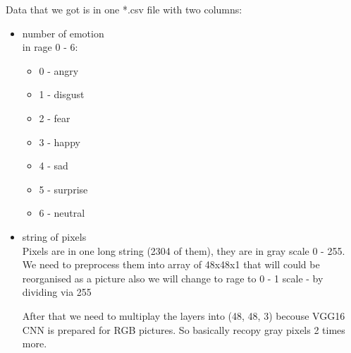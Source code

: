 Data that we got is in one *.csv file with two columns:
\begin{itemize}
  \item number of emotion \\
    in rage 0 - 6:
    \begin{itemize}
        \item 0 - angry
        \item 1 - disgust
        \item 2 - fear
        \item 3 - happy
        \item 4 - sad
        \item 5 - surprise
        \item 6 - neutral
    \end{itemize}
  \item string of pixels \\
    Pixels are in one long string (2304 of them), they are in gray scale 0 - 255.\\
    We need to preprocess them into array of 48x48x1 that will could be reorganised as
    a picture also we will change to rage to 0 - 1 scale - by dividing via 255
    
    After that we need to multiplay the layers into (48, 48, 3) becouse VGG16 CNN is prepared for RGB pictures.
    So basically recopy gray pixels 2 times more.
    


\end{itemize}
